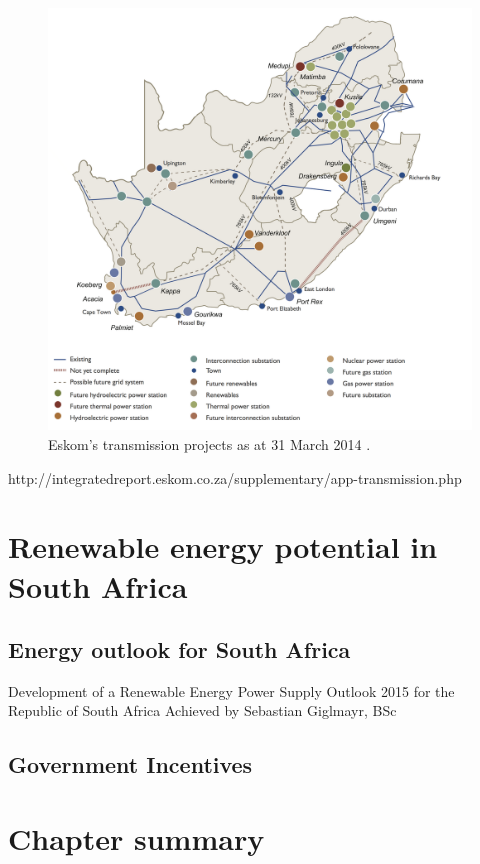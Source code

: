 \documentclass[Master,MEE,english]{twbook}%
\begin{document}
\begin{figure}[htbp] %
\centering
\includegraphics[width=0.9\linewidth]{FIG/transmissionprojekts}
\caption[Eskom’s transmission projects as at 31 March 2014.]{Eskom’s transmission projects as at 31 March 2014 \cite{Eskom2014}.}\label{Abb1}
\end{figure}

http://integratedreport.eskom.co.za/supplementary/app-transmission.php

\section{Renewable energy potential in South Africa}

\subsection{Energy outlook for South Africa}
Development of a Renewable Energy Power Supply Outlook 2015 for the Republic of South Africa
Achieved by Sebastian Giglmayr, BSc
\cite{Giglmayr2013}

\subsection{Government Incentives}

\section{Chapter summary}
\pagebreak
\end{document}
